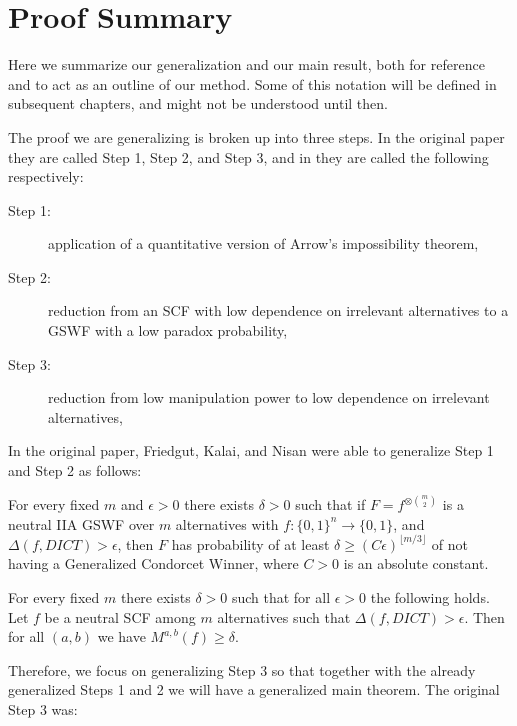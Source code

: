 \section {Proof Summary}

	Here we summarize our generalization and our main result, both for reference and to act as an outline of our method. Some of this notation will be defined in subsequent chapters, and might not be understood until then.

	The proof we are generalizing is broken up into three steps. In the original paper they are called Step 1, Step 2, and Step 3, and in \cite{friedgut2011quantitative} they are called the following respectively:
	\begin{description}
		\item[Step 1:] application of a quantitative version of Arrow's impossibility theorem,
		\item[Step 2:] reduction from an SCF with low dependence on irrelevant alternatives to a GSWF with a low paradox probability,
		\item[Step 3:] reduction from low manipulation power to low dependence on irrelevant alternatives,
	\end{description}

	In the original paper, Friedgut, Kalai, and Nisan were able to generalize Step 1 and Step 2 as follows:

	\begin{lemma}
		For every fixed $m$ and $\epsilon > 0$ there exists $\delta > 0$ such that if $F = f^{\otimes \binom{m}{2}}$ is a neutral IIA GSWF over $m$ alternatives with $f : \{0,1\}^n \rightarrow \{0,1\}$, and $\Delta(f, DICT) > \epsilon$, then $F$ has probability of at least $\delta \ge (C\epsilon)^{\lfloor m/3 \rfloor}$ of not having a Generalized Condorcet Winner, where $C > 0$ is an absolute constant.
	\end{lemma}

	\begin{lemma}
		For every fixed $m$ there exists $\delta > 0$ such that for all $\epsilon > 0$ the following holds. Let $f$ be a neutral SCF among $m$ alternatives such that $\Delta(f, DICT) > \epsilon$. Then for all $(a,b)$ we have $M^{a,b}(f) \ge \delta$.
	\end{lemma}

	Therefore, we focus on generalizing Step 3 so that together with the already generalized Steps 1 and 2 we will have a generalized main theorem. The original Step 3 was:

